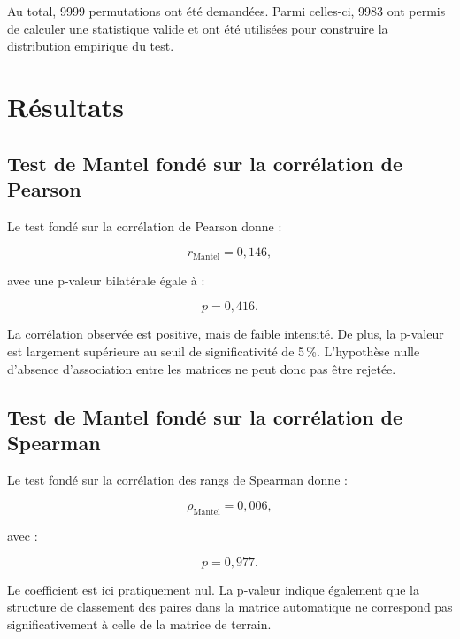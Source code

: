 \documentclass[11pt,a4paper]{report}
\begin{document}
Au total, 9999 permutations ont été demandées. Parmi celles-ci, 9983 ont
permis de calculer une statistique valide et ont été utilisées pour
construire la distribution empirique du test.


\section{Résultats}
\label{sec:resultats_mantel}

\subsection{Test de Mantel fondé sur la corrélation de Pearson}

Le test fondé sur la corrélation de Pearson donne :

\begin{equation}
    r_{\mathrm{Mantel}}
    =
    0{,}146,
\end{equation}

avec une p-valeur bilatérale égale à :

\begin{equation}
    p
    =
    0{,}416.
\end{equation}

La corrélation observée est positive, mais de faible intensité. De plus,
la p-valeur est largement supérieure au seuil de significativité de
5\,\%. L'hypothèse nulle d'absence d'association entre les matrices ne
peut donc pas être rejetée.


\subsection{Test de Mantel fondé sur la corrélation de Spearman}

Le test fondé sur la corrélation des rangs de Spearman donne :

\begin{equation}
    \rho_{\mathrm{Mantel}}
    =
    0{,}006,
\end{equation}

avec :

\begin{equation}
    p
    =
    0{,}977.
\end{equation}

Le coefficient est ici pratiquement nul. La p-valeur indique également
que la structure de classement des paires dans la matrice automatique
ne correspond pas significativement à celle de la matrice de terrain.
\end{document}
